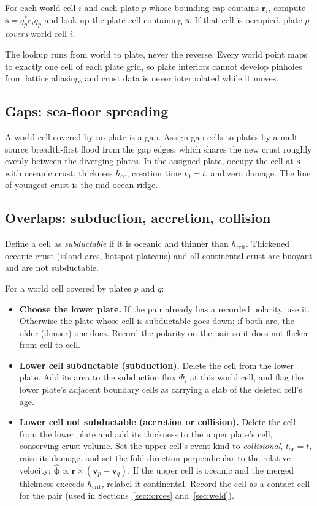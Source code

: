 \documentclass[11pt,a4paper]{article}
\newcommand{\vect}[1]{\bm{#1}}
\newcommand{\rr}{\vect{r}}
\begin{document}
For each world cell $i$ and each plate $p$ whose bounding cap contains $\rr_i$,
compute $\vect{s} = q_p^{*}\rr_i q_p$ and look up the plate cell containing
$\vect{s}$. If that cell is occupied, plate $p$ \emph{covers} world cell $i$.

The lookup runs from world to plate, never the reverse. Every world point maps
to exactly one cell of each plate grid, so plate interiors cannot develop
pinholes from lattice aliasing, and crust data is never interpolated while it
moves.

\subsection{Gaps: sea-floor spreading}

A world cell covered by no plate is a gap. Assign gap cells to plates by a
multi-source breadth-first flood from the gap edges, which shares the new
crust roughly evenly between the diverging plates. In the assigned plate,
occupy the cell at $\vect{s}$ with oceanic crust, thickness $h_\mathrm{oc}$,
creation time $t_0 = t$, and zero damage. The line of youngest crust is the
mid-ocean ridge.

\subsection{Overlaps: subduction, accretion, collision}

Define a cell as \emph{subductable} if it is oceanic and thinner than
$h_\mathrm{crit}$. Thickened oceanic crust (island arcs, hotspot plateaus) and
all continental crust are buoyant and are not subductable.

For a world cell covered by plates $p$ and $q$:
\begin{itemize}[leftmargin=*]
\item \textbf{Choose the lower plate.} If the pair already has a recorded
polarity, use it. Otherwise the plate whose cell is subductable goes down; if
both are, the older (denser) one does. Record the polarity on the pair so it
does not flicker from cell to cell.
\item \textbf{Lower cell subductable (subduction).} Delete the cell from the
lower plate. Add its area to the subduction flux $\Phi_i$ at this world cell,
and flag the lower plate's adjacent boundary cells as carrying a slab of the
deleted cell's age.
\item \textbf{Lower cell not subductable (accretion or collision).} Delete
the cell from the lower plate and add its thickness to the upper plate's cell,
conserving crust volume. Set the upper cell's event kind to
\emph{collisional}, $t_\mathrm{or} = t$, raise its damage, and set the fold
direction perpendicular to the relative velocity:
$\hat{\vect{\phi}} \propto \rr \times (\vect{v}_p - \vect{v}_q)$. If the
upper cell is oceanic and the merged thickness exceeds $h_\mathrm{crit}$,
relabel it continental. Record the cell as a contact cell for the pair
(used in Sections~\ref{sec:forces} and~\ref{sec:weld}).
\end{itemize}
\end{document}
